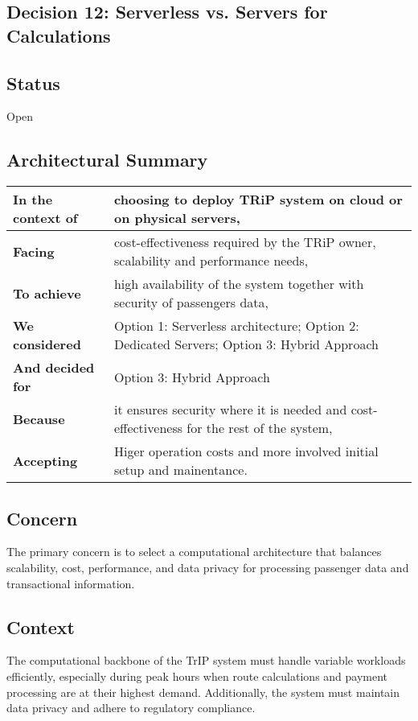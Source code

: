 \subsection{Decision 12: Serverless vs. Servers for Calculations}

\subsection*{Status}
Open

\subsection*{Architectural Summary}
\begin{tabular}{|p{3.5cm}|p{10.5cm}|}
    \hline
    \textbf{In the context of} & choosing to deploy TRiP system on cloud or on physical servers, \\
    \hline
    \textbf{Facing} & cost-effectiveness required by the TRiP owner, scalability and performance needs, \\
    \hline
    \textbf{To achieve} & high availability of the system together with security of passengers data, \\
    \hline
    \textbf{We considered} & Option 1: Serverless architecture; Option 2: Dedicated Servers; Option 3: Hybrid Approach\\
    \hline
    \textbf{And decided for} & Option 3: Hybrid Approach \\
    \hline
    \textbf{Because} & it ensures security where it is needed and cost-effectiveness for the rest of the system, \\
    \hline
    \textbf{Accepting} & Higer operation costs and more involved initial setup and mainentance. \\
    \hline
\end{tabular}

\subsection*{Concern}
The primary concern is to select a computational architecture that balances scalability, cost, performance, and data privacy for processing passenger data and transactional information.

\subsection*{Context}
The computational backbone of the TrIP system must handle variable workloads efficiently, especially during peak hours when route calculations and payment processing are at their highest demand. Additionally, the system must maintain data privacy and adhere to regulatory compliance.

